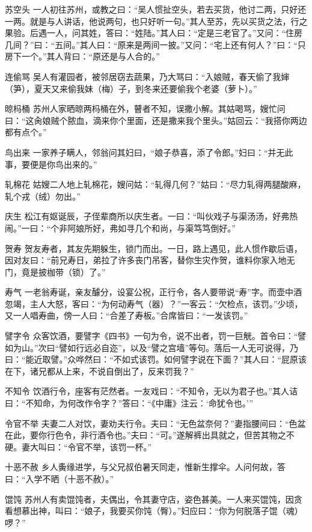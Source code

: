 \documentclass[12pt,UTF8]{ctexbook}
\begin{document}
苏空头
一人初往苏州，或教之曰：“吴人惯扯空头，若去买货，他讨二两，只好还一两。就是与人讲话，他说两句，也只好听一句。”其人至苏，先以买货之法，行之果验。后遇一人，问其姓，答曰：“姓陆。”其人曰：“定是三老官了。”又问：“住房几间？”曰：“五间。”其人曰：“原来是两间一披。”又问：“宅上还有何人？”曰：“只房下一个。”其人背曰：“原还是与人合的。”

连偷骂
吴人有灌园者，被邻居窃去蔬果，乃大骂曰：“入娘贼，春天偷了我婶（笋），夏天又来偷我妹（梅）子，到冬来还要偷我个老婆（萝卜）。”

晾杩桶
苏州人家晒晾两杩桶在外，瞽者不知，误撒小解。其姑喝骂，嫂忙问曰：“这肏娘贼个脓血，滴来你个里面，还是撒来我个里头。”姑回云：“我搭你两边都有点个。”

鸟出来
一家养子瞒人，邻翁问其妇曰，“娘子恭喜，添了令郎。”妇曰：“并无此事，要便是你鸟出来的。”

轧棉花
姑嫂二人地上轧棉花，嫂问姑：“轧得几何？”姑曰：“尽力轧得两腿酸麻，轧个戎（绒）勿出。”

庆生
松江有妪诞辰，子侄辈商所以庆生者。一曰：“叫伙戏子与渠汤汤，好弗热闹。”一曰：“个非阿娘所好，弗如寻几个和尚，与渠笃笃倒好。”

贺寿
贺友寿者，其友先期躲生，锁门而出。一日，路上遇见，此人惯作歇后语，因对友曰：“前兄寿日，弟拉了许多丧门吊客，替你生灾作贺，谁料你家入地无门，竟是披枷带（锁）了。”

寿气
一老翁寿诞，亲友醵分，设宴公祝，正行令，各人要带说“寿”字。而壶中酒忽竭，主人大怒，客曰：“为何动寿气（器）？”一客云：“欠检点，该罚。”少顷，又一人唱寿曲，傍一人曰：“合差了寿板。”合席皆曰：“一发该罚。”

譬字令
众客饮酒，要譬字《四书》一句为令，说不出者，罚一巨觥。首令曰：“譬如为山。”次曰“譬如行远必自迩”，以及“譬之宫墙”等句。落后一人无可说得，乃曰：“能近取譬。”众哗然曰：“不如式该罚。如何譬字说在下面？”其人曰：“屁原该在下，诸兄都从上来，不说自倒出了，反来罚我？”

不知令
饮酒行令，座客有茫然者。一友戏曰：“不知令，无以为君子也。”其人诘曰：“不知命，为何改作令字？”答曰：“《中庸》注云：‘命犹令也。’”

令官不举
夫妻二人对饮，妻劝夫行令。夫曰：“无色盆奈何？”妻指腰间曰：“色盆在此，要你行色令，非行酒令也。”夫曰：“可。”遂解裤出具就之，但苦其物之不硬。妻大叫曰：“令官不举，该罚一杯。”

十恶不赦
乡人夤缘进学，与父兄叔伯暑天同走，惟新生撑伞。人问何故，答曰：“入学不晒（十恶不赦）。”

馄饨
苏州人有卖馄饨者，夫偶出，令其妻守店，姿色甚美。一人来买馄饨，因贪看想慕出神，叫曰：“娘子，我要买你饨（臀）。”妇应曰：“你为何脱落子馄（魂）啰？”
\end{document}
